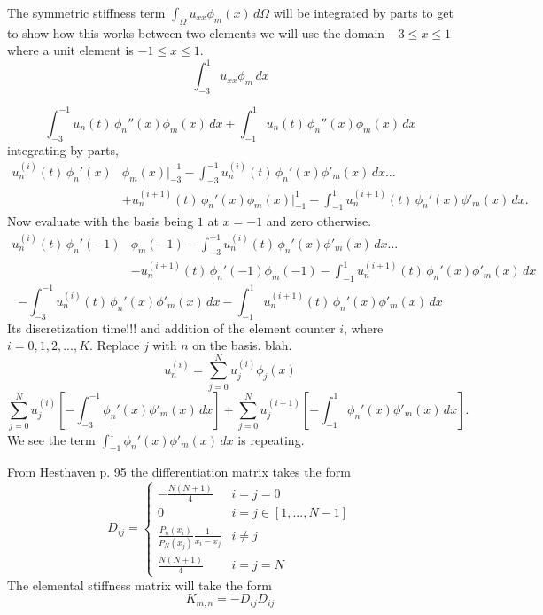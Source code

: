 \documentclass[12pt]{article}%
\begin{document}
The symmetric stiffness term $\int_\Omega u_{xx} \phi_m(x)\,d\Omega$ will be integrated by parts to get to show how this works between two elements we will use the domain $-3\leq x \leq 1$ where a unit element is $-1\leq x \leq 1$.
\begin{equation}
\int_{-3}^1 u_{xx} \phi_m\,dx
\end{equation}

\begin{equation}
\int_{-3}^{-1} u_n(t)\,\phi_n''(x) \phi_m(x)\,dx+\int_{-1}^1 u_n(t)\,\phi_n''(x) \phi_m(x)\,dx
\end{equation}
integrating by parts,
\begin{align}
u^{(i)}_n(t)\,\phi_n'(x)& \phi_m(x)\Big|_{-3}^{-1}-\int_{-3}^{-1} u^{(i)}_n(t)\,\phi_n'(x) \phi'_m(x)\,dx...\\
&+u_n^{(i+1)}(t)\,\phi_n'(x) \phi_m(x)\Big|_{-1}^{1}-\int_{-1}^{1} u^{(i+1)}_n(t)\,\phi_n'(x) \phi'_m(x)\,dx.\nonumber
\end{align}
Now evaluate with the basis being $1$ at $x=-1$ and zero otherwise.
\begin{align}
u_n^{(i)}(t)\,\phi_n'(-1)& \phi_m(-1)-\int_{-3}^{-1} u_n^{(i)}(t)\,\phi_n'(x) \phi'_m(x)\,dx...\\
&-u^{(i+1)}_n(t)\,\phi_n'(-1) \phi_m(-1)-\int_{-1}^{1} u_n^{(i+1)}(t)\,\phi_n'(x) \phi'_m(x)\,dx\nonumber
\end{align}
\begin{equation}
-\int_{-3}^{-1} u^{(i)}_n(t)\,\phi_n'(x) \phi'_m(x)\,dx-\int_{-1}^{1} u^{(i+1)}_n(t)\,\phi_n'(x) \phi'_m(x)\,dx
\end{equation}
Its discretization time!!! and addition of the element counter $i$, where $i=0,1,2,...,K$. Replace $j$ with $n$ on the basis. blah.
\begin{equation}
u^{(i)}_n=\sum_{j=0}^N u^{(i)}_j\phi_j(x)
\end{equation}
\begin{equation}
\sum_{j=0}^N u^{(i)}_j\left[-\int_{-3}^{-1} \phi_n'(x) \phi'_m(x)\,dx\right]+\sum_{j=0}^N u^{(i+1)}_j\left[-\int_{-1}^{1} \phi_n'(x) \phi'_m(x)\,dx\right].
\end{equation}
We see the term $\int_{-1}^{1} \phi_n'(x) \phi'_m(x)\,dx$ is repeating.

From Hesthaven p. 95 the differentiation matrix takes the form
\begin{equation}
D_{ij}=\begin{cases}
-\frac{N(N+1)}{4} &i=j=0\\
0& i=j\in [1,...,N-1]\\
\frac{P_n(x_i)}{P_N(x_j)}\frac{1}{x_i-x_j} & i\neq j\\
\frac{N(N+1)}{4} & i=j=N
\end{cases}
\end{equation}
The elemental stiffness matrix will take the form
\begin{equation}
K_{m,n}=-D_{ij}D_{ij}
\end{equation}
\end{document}
